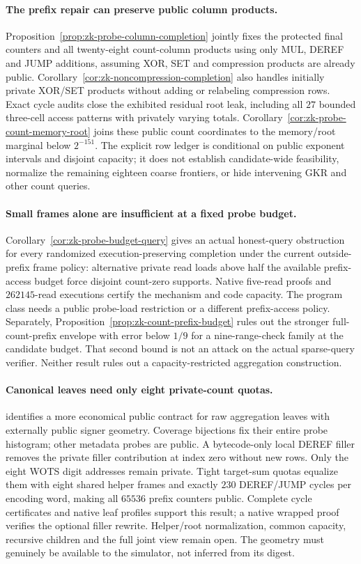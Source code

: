 \paragraph{The prefix repair can preserve public column products.} Proposition~\ref{prop:zk-probe-column-completion} jointly fixes the protected final counters and all twenty-eight count-column products using only MUL, DEREF and JUMP additions, assuming XOR, SET and compression products are already public. Corollary~\ref{cor:zk-noncompression-completion} also handles initially private XOR/SET products without adding or relabeling compression rows. Exact cycle audits close the exhibited residual root leak, including all $27$ bounded three-cell access patterns with privately varying totals. Corollary~\ref{cor:zk-probe-count-memory-root} joins these public count coordinates to the memory/root marginal below $2^{-151}$. The explicit row ledger is conditional on public exponent intervals and disjoint capacity; it does not establish candidate-wide feasibility, normalize the remaining eighteen coarse frontiers, or hide intervening GKR and other count queries.

\paragraph{Small frames alone are insufficient at a fixed probe budget.} Corollary~\ref{cor:zk-probe-budget-query} gives an actual honest-query obstruction for every randomized execution-preserving completion under the current outside-prefix frame policy: alternative private read loads above half the available prefix-access budget force disjoint count-zero supports. Native five-read proofs and $262145$-read executions certify the mechanism and code capacity. The program class needs a public probe-load restriction or a different prefix-access policy. Separately, Proposition~\ref{prop:zk-count-prefix-budget} rules out the stronger full-count-prefix envelope with error below $1/9$ for a nine-range-check family at the candidate budget. That second bound is not an attack on the actual sparse-query verifier. Neither result rules out a capacity-restricted aggregation construction.

\paragraph{Canonical leaves need only eight private-count quotas.}  identifies a more economical public contract for raw aggregation leaves with externally public signer geometry. Coverage bijections fix their entire probe histogram; other metadata probes are public. A bytecode-only local DEREF filler removes the private filler contribution at index zero without new rows. Only the eight WOTS digit addresses remain private. Tight target-sum quotas equalize them with eight shared helper frames and exactly $230$ DEREF/JUMP cycles per encoding word, making all $65536$ prefix counters public. Complete cycle certificates and native leaf profiles support this result; a native wrapped proof verifies the optional filler rewrite. Helper/root normalization, common capacity, recursive children and the full joint view remain open. The geometry must genuinely be available to the simulator, not inferred from its digest.

